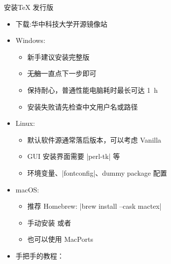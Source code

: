 \begin{frame}{安装\TeX{} 发行版}
  \begin{itemize}
    \item 下载:华中科技大学开源镜像站  \pause
    \item \faWindows{} Windows:
      \begin{itemize}
        \item 新手建议安装完整版 \TeXLive{}
        \item \sout{无脑}一直点下一步即可
        \item 保持耐心，普通性能电脑耗时最长可达 \qty{1}{h}
        \item 安装失败请先检查中文用户名或路径
      \end{itemize} \pause
    \item \faLinux{} Linux:
      \begin{itemize}
        \item 默认软件源通常落后版本，可以考虑 Vanilla \TeXLive{}
        \item GUI 安装界面需要 |perl-tk| 等
        \item 环境变量、|fontconfig|、dummy package 配置
      \end{itemize}
    \item \faApple{} macOS:
      \begin{itemize}
        \item 推荐 Homebrew: |brew install --cask mactex|
        \item 手动安装 \MacTeX{} 或者 \TeXLive{}
        \item 也可以使用 MacPorts
      \end{itemize}
    \item 手把手的教程：
  \end{itemize}
\end{frame}


